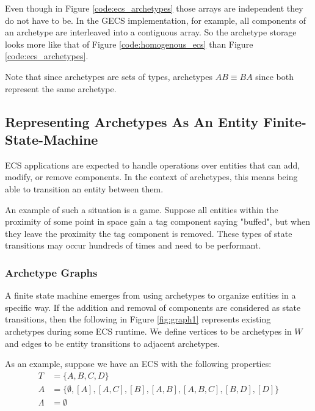 Even though in Figure \ref{code:ecs_archetypes} those arrays are independent they do not have to be. In the GECS implementation, for example, all components of an archetype are interleaved into a contiguous array. So the archetype storage looks more like that of Figure \ref{code:homogenous_ecs} than Figure \ref{code:ecs_archetypes}.

Note that since archetypes are sets of types, archetypes $AB \equiv BA$ since both represent the same archetype.

\subsection{Representing Archetypes As An Entity Finite-State-Machine}
\label{sec:fsm_arc}
ECS applications are expected to handle operations over entities that can add, modify, or remove components. In the context of archetypes, this means being able to transition an entity between them. 

An example of such a situation is a game. Suppose all entities within the proximity of some point in space gain a tag component saying "buffed", but when they leave the proximity the tag component is removed. These types of state transitions may occur hundreds of times and need to be performant. 

\subsubsection{Archetype Graphs}

A finite state machine emerges from using archetypes to organize entities in a specific way. If the addition and removal of components are considered as state transitions, then the following in Figure \ref{fig:graph1} represents existing archetypes during some ECS runtime. We define vertices to be archetypes in $W$ and edges to be entity transitions to adjacent archetypes.

As an example, suppose we have an ECS with the following properties:
\begin{align}
    T &= \{A,B,C,D\} \\
    A &= \{ \emptyset, [A] , [A,C] ,[B], [A,B], [A,B,C], [B,D], [D]\} \\
    \Lambda &= \emptyset
\end{align}
                                    
